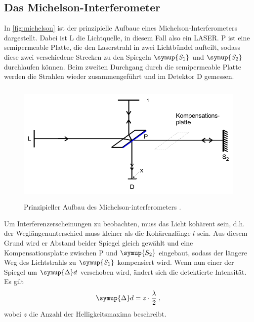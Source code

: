 \subsection{Das Michelson-Interferometer}
In \autoref{fig:michelson} ist der prinzipielle Aufbaue eines Michelson-Interferometers dargestellt. Dabei ist L die Lichtquelle, in diesem Fall
also ein LASER. P ist eine semipermeable Platte, die den Laserstrahl in zwei Lichtbündel aufteilt, sodass diese zwei verschiedene Strecken 
zu den Spiegeln $\symup{S_1}$ und $\symup{S_2}$ durchlaufen können. Beim zweiten Durchgang durch die semipermeable Platte werden die Strahlen 
wieder zusammengeführt und im Detektor D gemessen. 
\begin{figure}
    \centering
    \includegraphics[height = 6cm]{michelson.pdf}
    \caption{Prinzipieller Aufbau des Michelson-interferometers \cite{ap401}.}
    \label{fig:michelson}
\end{figure}
Um Interferenzerscheinungen zu beobachten, muss das Licht kohärent sein, d.h. der Weglängenunterschied muss kleiner als die Kohärenzlänge $l$ sein. 
Aus diesem Grund wird er Abstand beider Spiegel gleich gewählt und eine Kompensationsplatte zwischen P und $\symup{S_2}$ eingebaut, sodass der längere 
Weg des Lichtstrahls zu $\symup{S_1}$ kompensiert wird. Wenn nun einer der Spiegel um $\symup{\Delta}d$ verschoben wird, ändert sich die detektierte 
Intensität. Es gilt
\begin{equation*}
    \symup{\Delta}d = z \cdot \frac{\lambda}{2} \; ,
\end{equation*}
wobei $z$ die Anzahl der Helligkeitsmaxima beschreibt.

